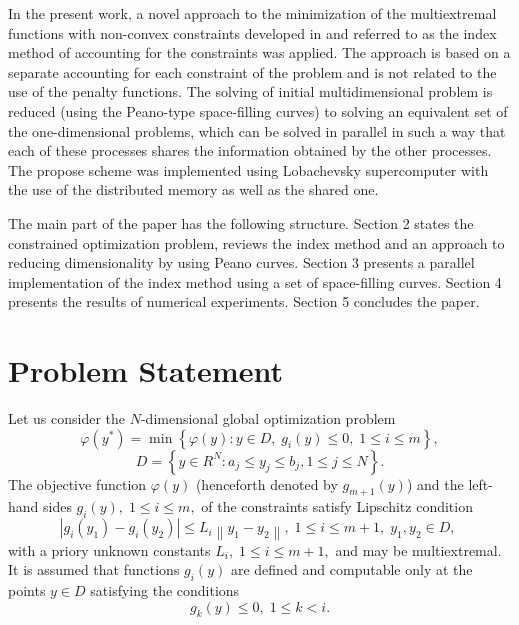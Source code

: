 \documentclass[smallextended]{svjour3}       %
\begin{document}
In the present work, a novel approach to the minimization of the multiextremal functions with non-convex constraints developed in \cite{Strongin2000,Sergeyev2001,Barkalov2002} and referred to as the index method  of accounting for the constraints was applied. The approach is based on a separate accounting for each constraint of the problem and is not related to the use of the penalty functions. The solving of initial multidimensional problem is reduced (using the Peano-type space-filling curves) to solving an equivalent set of the one-dimensional problems, which can be solved in parallel in such a way that each of these processes shares the information obtained by the other processes. The propose scheme was implemented using Lobachevsky supercomputer with the use of the distributed memory as well as the shared one.

The main part of the paper has the following structure. Section 2 states the constrained optimization problem, reviews the index method and an approach to reducing dimensionality by using Peano curves. Section 3 presents a parallel implementation of the index method using a set of space-filling curves. Section 4 presents the results of numerical experiments. Section 5 concludes the paper.


\section{Problem Statement}
\label{sec:2}

Let us consider the $N$-dimensional global optimization problem
\begin{equation}\label{problem}
\varphi(y^\ast)=\min{\left\{\varphi(y):y\in D, \; g_i(y)\leq 0, \; 1 \leq i \leq m\right\}},
\end{equation}
\begin{equation}\label{D}
D=\left\{y\in R^N: a_j\leq y_j \leq b_j, 1\leq j \leq N \right\}.
\end{equation}
The objective function $\varphi(y)$ (henceforth denoted by $g_{m+1}(y)$) and the left-hand sides $g_i(y), \; 1\leq i \leq m,$ of the constraints satisfy Lipschitz condition 
\[
\left|g_i(y_1)-g_i(y_2)\right|\leq L_i\left\|y_1-y_2\right\|, \;1\leq i\leq m+1, \; y_1,y_2 \in D,\;
\]
with a priory unknown constants $L_i, \; 1 \leq i \leq m+1,$ and may be multiextremal. It is assumed that functions $g_i(y)$ are defined and computable only at the points $y \in D$ satisfying the conditions
\begin{equation}\label{g_k}
g_k(y) \leq 0, \; 1 \leq k < i.
\end{equation}
\end{document}
